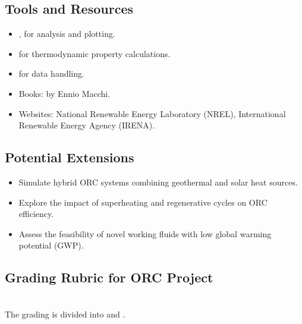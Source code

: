 \documentclass[letterpaper,10pt,english]{jupyterBook}
\begin{document}
\subsection{Tools and Resources}
\label{\detokenize{ProjectInstructions:id6}}
\sphinxAtStartPar
{}
\begin{itemize}
\item {} 
\sphinxAtStartPar
{},  for analysis and plotting.

\item {} 
\sphinxAtStartPar
{} for thermodynamic property calculations.

\item {} 
\sphinxAtStartPar
{} for data handling.

\end{itemize}

\sphinxAtStartPar
{}
\begin{itemize}
\item {} 
\sphinxAtStartPar
Books:  by
Ennio Macchi.

\item {} 
\sphinxAtStartPar
Websites: National Renewable Energy Laboratory (NREL), International
Renewable Energy Agency (IRENA).

\end{itemize}


\subsection{Potential Extensions}
\label{\detokenize{ProjectInstructions:id7}}\begin{itemize}
\item {} 
\sphinxAtStartPar
Simulate hybrid ORC systems combining geothermal and solar heat
sources.

\item {} 
\sphinxAtStartPar
Explore the impact of superheating and regenerative cycles on ORC
efficiency.

\item {} 
\sphinxAtStartPar
Assess the feasibility of novel working fluids with low global
warming potential (GWP).

\end{itemize}


\subsection{Grading Rubric for ORC Project}
\label{\detokenize{ProjectInstructions:grading-rubric-for-orc-project}}
\sphinxAtStartPar
{}\\
The grading is divided into  and .
\end{document}
